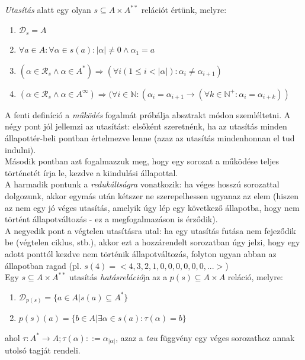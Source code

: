 \documentclass[12pt]{article}
\newcommand{\sut}{$s \subseteq A \times A^{**}$ }
\begin{document}
\textit{Utasítás} alatt egy olyan \sut relációt értünk, melyre:
\begin{enumerate}
	\item $\mathcal{D}_s = A$
	\item $\forall a \in A : \forall \alpha \in s(a) : |\alpha|\ne 0 \land  \alpha_1 = a $
	\item $(\alpha \in \mathcal{R}_s \land \alpha \in A^*  ) \Rightarrow (\forall i (1 \le i < |\alpha|): \alpha_i \ne \alpha_{i+1} )$
	\item $(\alpha \in \mathcal{R}_s \land \alpha \in A^{\infty}) \Rightarrow (\forall i \in \mathbb{N}: (\alpha_{i} = \alpha_{i+1} \rightarrow (\forall k \in \mathbb{N^+}: \alpha_{i} = \alpha_{i+k}))$
\end{enumerate}
A fenti definíció a \textit{működés} fogalmát próbálja absztrakt módon szemléltetni. A négy pont jól jellemzi az utasítást: elsőként szeretnénk, ha az utasítás minden állapottér-beli pontban értelmezve lenne (azaz az utasítás mindenhonnan el tud indulni).\\
Második pontban azt fogalmazzuk meg, hogy egy sorozat a működése teljes történetét írja le, kezdve a kiindulási állapottal.\\
A harmadik pontunk a \textit{redukáltságra} vonatkozik: ha véges hosszú sorozattal dolgozunk, akkor egymás után kétszer ne szerepelhessen ugyanaz az elem (hiszen az nem egy jó véges utasítás, amelyik úgy lép egy következő állapotba, hogy nem történt állapotváltozás - ez a megfogalmazáson is érződik).\\
A negyedik pont a végtelen utasításra utal: ha egy utasítás futása nem fejeződik be (végtelen ciklus, stb.), akkor ezt a hozzárendelt sorozatban úgy jelzi, hogy egy adott ponttól kezdve nem történik állapotváltozás, folyton ugyan abban az állapotban ragad (pl. $s(4) = <4, 3, 2, 1, 0, 0, 0, 0, 0, 0, ...>$) \\


Egy \sut utasítás \textit{hatásreláció}ja az a $p(s) \subseteq A \times A$ reláció, melyre:
\begin{enumerate}
	\item $ \mathcal{D}_{p(s)} = \{a \in A | s(a) \subseteq A^* \} $
	\item $ p(s)(a) = \{ b \in  A | \exists \alpha \in s(a) : \tau(\alpha) = b  \}$
\end{enumerate}
ahol $\tau: A^* \rightarrow A; \tau(\alpha) ::= \alpha_{|\alpha|}$, azaz a \textit{tau} függvény egy véges sorozathoz annak utolsó tagját rendeli.
\end{document}
